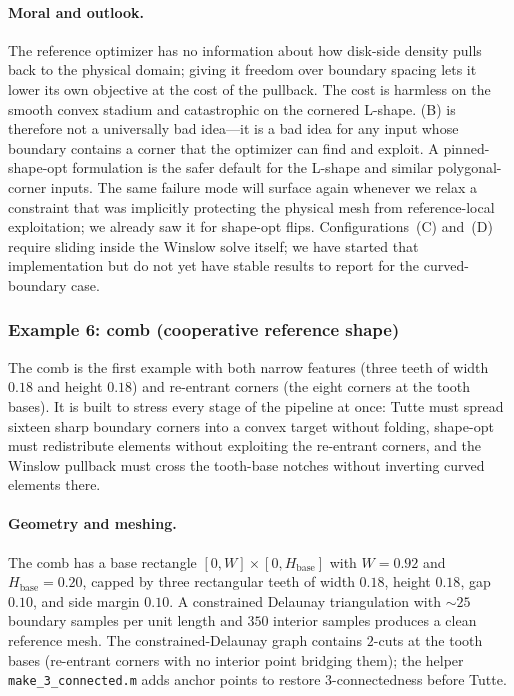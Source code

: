 \documentclass[11pt]{article}
\begin{document}
\paragraph{Moral and outlook.}
The reference optimizer has no information about how disk-side
density pulls back to the physical domain; giving it freedom
over boundary spacing lets it lower its own objective at the
cost of the pullback. The cost is harmless on the smooth convex
stadium and catastrophic on the cornered L-shape. (B) is
therefore not a universally bad idea---it is a bad idea for
any input whose boundary contains a corner that the optimizer
can find and exploit. A pinned-shape-opt formulation is the
safer default for the L-shape and similar polygonal-corner
inputs. The same failure mode will surface again whenever we
relax a constraint that was implicitly protecting the physical
mesh from reference-local exploitation; we already saw it for
shape-opt flips. Configurations~(C) and~(D) require sliding
inside the Winslow solve itself; we have started that
implementation but do not yet have stable results to report
for the curved-boundary case.

\subsubsection{Example 6: comb (cooperative reference shape)}
\label{sec:tutte-ex-comb}

The comb is the first example with both narrow features (three teeth
of width $0.18$ and height $0.18$) and re-entrant corners (the eight
corners at the tooth bases). It is built to stress every stage of
the pipeline at once: Tutte must spread sixteen sharp boundary
corners into a convex target without folding, shape-opt must
redistribute elements without exploiting the re-entrant corners, and
the Winslow pullback must cross the tooth-base notches without
inverting curved elements there.

\paragraph{Geometry and meshing.} The comb has a base rectangle
$[0, W] \times [0, H_{\mathrm{base}}]$ with $W = 0.92$ and
$H_{\mathrm{base}} = 0.20$, capped by three rectangular teeth of
width $0.18$, height $0.18$, gap $0.10$, and side margin $0.10$.
A constrained Delaunay triangulation with $\sim 25$ boundary samples
per unit length and $350$ interior samples produces a clean
reference mesh. The constrained-Delaunay graph contains $2$-cuts at
the tooth bases (re-entrant corners with no interior point bridging
them); the helper \texttt{make\_3\_connected.m} adds anchor points
to restore $3$-connectedness before Tutte.
\end{document}
